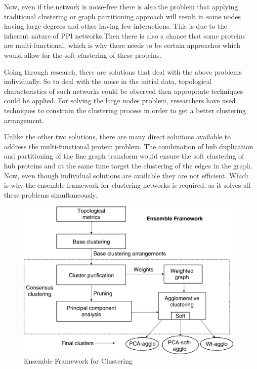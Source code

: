 Now, even if the network is noise-free there is also the problem that applying traditional clustering or graph partitioning approach will result in some nodes having large degrees and other having few interactions.\cite{asur_ucar_parthasarathy_2007} This is due to the inherent nature of PPI networks.Then there is also a chance that some proteins are multi-functional, which is why there needs to be certain approaches which would allow for the soft clustering of these proteins.

Going through research, there are solutions that deal with the above problems individually. So to deal with the noise in the initial data, topological characteristics of such networks could be observed \cite{chen_hsu_lee_ng_2006} then appropriate techniques could be applied. For solving the large nodes problem, researchers have used techniques to constrain the clustering process \cite{singh_xu_berger_2005} in order to get a better clustering arrangement.

Unlike the other two solutions, there are many direct solutions available to address the multi-functional protein problem. The combination of hub duplication \cite{ucar_asur_catalyurek_parthasarathy_2006} and partitioning of the line graph transform would ensure the soft clustering of hub proteins and at the same time target the clustering of the edges in the graph. Now, even though individual solutions are available they are not efficient. Which is why the ensemble framework for clustering networks is required, as it solves all these problems simultaneously.
\begin{figure}[ht!]
\centering
\includegraphics[scale=0.3]{./ensemble_cluster.jpeg}
\caption{Ensemble Framework for Clustering}
\label{fig:ensemble_cluster}
\end{figure}

